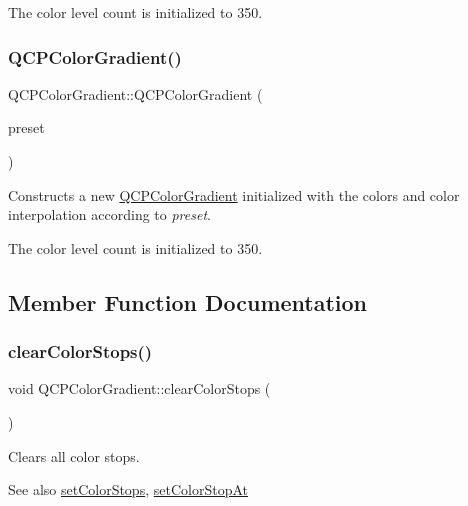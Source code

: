 The color level count is initialized to 350. \mbox{\label{class_q_c_p_color_gradient_a4e570b4004fd60bd135e52d685ed2b66}} 
\subsubsection{\texorpdfstring{QCPColorGradient()}{QCPColorGradient()}\hspace{0.1cm}{\footnotesize\ttfamily [2/2]}}
{\footnotesize\ttfamily Q\+C\+P\+Color\+Gradient\+::\+Q\+C\+P\+Color\+Gradient (\begin{DoxyParamCaption}\item[{\mbox{\hyperlink{class_q_c_p_color_gradient_aed6569828fee337023670272910c9072}{Gradient\+Preset}}}]{preset }\end{DoxyParamCaption})}

Constructs a new \mbox{\hyperlink{class_q_c_p_color_gradient}{Q\+C\+P\+Color\+Gradient}} initialized with the colors and color interpolation according to {\itshape preset}.

The color level count is initialized to 350. 

\subsection{Member Function Documentation}
\mbox{\label{class_q_c_p_color_gradient_a939213e85f0d1279519d555c5fcfb6ad}} 
\subsubsection{\texorpdfstring{clearColorStops()}{clearColorStops()}}
{\footnotesize\ttfamily void Q\+C\+P\+Color\+Gradient\+::clear\+Color\+Stops (\begin{DoxyParamCaption}{ }\end{DoxyParamCaption})}

Clears all color stops.

\begin{DoxySeeAlso}{See also}
\mbox{\hyperlink{class_q_c_p_color_gradient_a724e828aa6f0ba5011a9392477c35d3a}{set\+Color\+Stops}}, \mbox{\hyperlink{class_q_c_p_color_gradient_a3b48be5e78079db1bb2a1188a4c3390e}{set\+Color\+Stop\+At}} 
\end{DoxySeeAlso}
\mbox{\label{class_q_c_p_color_gradient_a0599545c859268b025d2060dea741cea}} 
